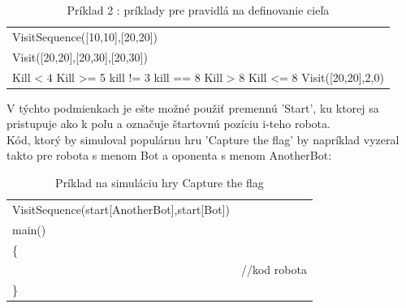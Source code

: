 \begin{table}
\centering
\begin{tabular}{l}
VisitSequence([10,10],[20,20])\\
Visit([20,20],[20,30],[20,30])\\
Kill < 4
Kill >= 5
kill != 3
kill == 8
Kill > 8
Kill <= 8
Visit([20,20],2,0)\\

\end{tabular}
\caption {Príklad 2 : príklady pre pravidlá na definovanie cieľa} %
\label{tab:allVis}
\end{table}

V týchto podmienkach je ešte možné použiť premennú 'Start', ku ktorej sa pristupuje ako k poľu a označuje štartovnú pozíciu i-teho robota.\\
Kód, ktorý by simuloval populárnu hru 'Capture the flag' by napríklad vyzeral takto pre robota s menom Bot a oponenta s menom AnotherBot:\\
\begin{table}
\centering
\begin{tabular}{l c}
VisitSequence(start[AnotherBot],start[Bot]) &\\ 
main()\\
\{\\
&//kod robota\\
\}\\
\end{tabular}
\caption{ Príklad na simuláciu hry Capture the flag }
\end{table}

